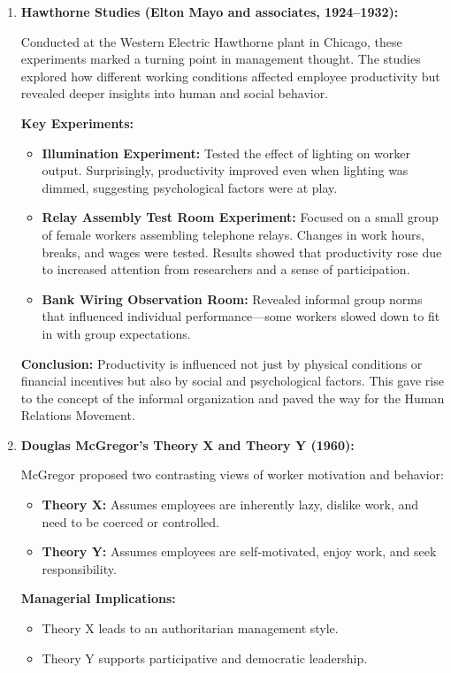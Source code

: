 \documentclass[10pt,a4paper]{book}
\begin{document}
\begin{enumerate}
    \item \textbf{Hawthorne Studies (Elton Mayo and associates, 1924–1932):}

    Conducted at the Western Electric Hawthorne plant in Chicago, these experiments marked a turning point in management thought. The studies explored how different working conditions affected employee productivity but revealed deeper insights into human and social behavior.

    \textbf{Key Experiments:}
    \begin{itemize}
        \item \textbf{Illumination Experiment:} Tested the effect of lighting on worker output. Surprisingly, productivity improved even when lighting was dimmed, suggesting psychological factors were at play.
        \item \textbf{Relay Assembly Test Room Experiment:} Focused on a small group of female workers assembling telephone relays. Changes in work hours, breaks, and wages were tested. Results showed that productivity rose due to increased attention from researchers and a sense of participation.
        \item \textbf{Bank Wiring Observation Room:} Revealed informal group norms that influenced individual performance—some workers slowed down to fit in with group expectations.
    \end{itemize}

    \textbf{Conclusion:} Productivity is influenced not just by physical conditions or financial incentives but also by social and psychological factors. This gave rise to the concept of the informal organization and paved the way for the Human Relations Movement.

    \item \textbf{Douglas McGregor's Theory X and Theory Y (1960):}

    McGregor proposed two contrasting views of worker motivation and behavior:

    \begin{itemize}
        \item \textbf{Theory X:} Assumes employees are inherently lazy, dislike work, and need to be coerced or controlled.
        \item \textbf{Theory Y:} Assumes employees are self-motivated, enjoy work, and seek responsibility.
    \end{itemize}

    \textbf{Managerial Implications:}
    \begin{itemize}
        \item Theory X leads to an authoritarian management style.
        \item Theory Y supports participative and democratic leadership.
    \end{itemize}


\end{enumerate}
\end{document}
